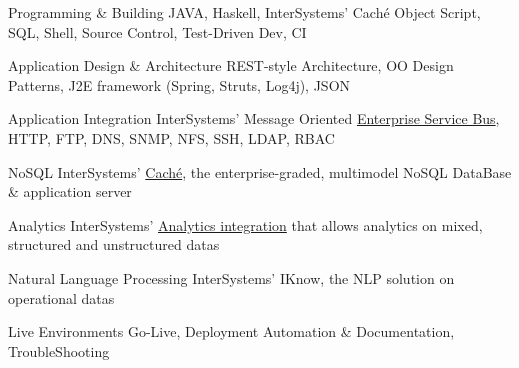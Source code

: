 

\begin{cvskills}

  \cvskill
    {Programming \& Building} %
    {JAVA, Haskell, InterSystems' Caché Object Script, SQL, Shell, Source Control, Test-Driven Dev, CI} %

  \cvskill
    {Application Design \& Architecture} %
    {REST-style Architecture, OO Design Patterns, J2E framework (Spring, Struts, Log4j), JSON} %

  \cvskill
    {Application Integration} %
    {InterSystems' Message Oriented {\href{https://www.intersystems.com/products/ensemble}{Enterprise Service Bus}}, HTTP, FTP, DNS, SNMP, NFS, SSH, LDAP, RBAC} %

  \cvskill
    {NoSQL} %
    {InterSystems' \href{https://www.intersystems.com/products/cache}{Caché}, the enterprise-graded, multimodel NoSQL DataBase \& application server} %

  \cvskill
    {Analytics} %
    {InterSystems' \href{https://learning.intersystems.com/pluginfile.php/15024/mod_resource/content/4/AnInterSystemsGuideToTheDataGalaxy.pdf}{Analytics integration} that allows analytics on mixed, structured and unstructured datas} %

  \cvskill
    {Natural Language Processing} %
    {InterSystems' IKnow, the NLP solution on operational datas} %

  \cvskill
    {Live Environments} %
    {Go-Live, Deployment Automation \& Documentation, TroubleShooting} %

\end{cvskills}
